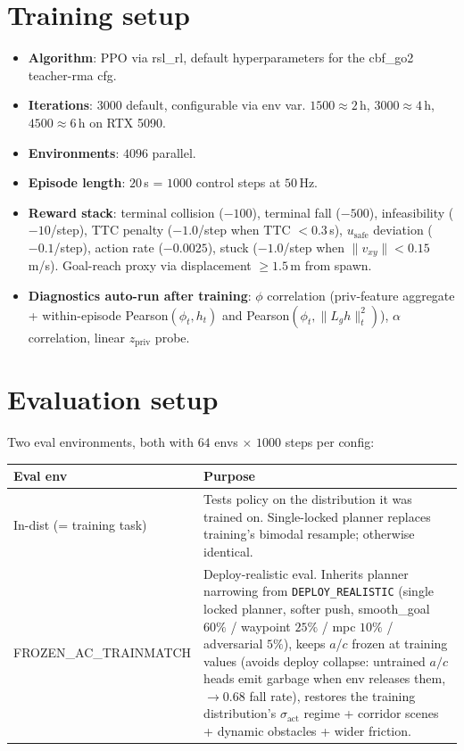 \documentclass[11pt]{article}
\begin{document}
\section*{Training setup}

\begin{itemize}
\item \textbf{Algorithm}: PPO via rsl\_rl, default hyperparameters for the cbf\_go2 teacher-rma cfg.
\item \textbf{Iterations}: $3000$ default, configurable via env var. $1500 \approx 2$\,h, $3000 \approx 4$\,h, $4500 \approx 6$\,h on RTX 5090.
\item \textbf{Environments}: $4096$ parallel.
\item \textbf{Episode length}: $20$\,s = $1000$ control steps at $50$\,Hz.
\item \textbf{Reward stack}: terminal collision ($-100$), terminal fall ($-500$), infeasibility ($-10$/step), TTC penalty ($-1.0$/step when TTC $<0.3$\,s), $u_\text{safe}$ deviation ($-0.1$/step), action rate ($-0.0025$), stuck ($-1.0$/step when $\|v_{xy}\| < 0.15$\,m/s). Goal-reach proxy via displacement $\geq 1.5$\,m from spawn.
\item \textbf{Diagnostics auto-run after training}: $\phi$ correlation (priv-feature aggregate + within-episode Pearson$(\phi_t, h_t)$ and Pearson$(\phi_t, \|L_g h\|^2_t)$), $\alpha$ correlation, linear $z_\text{priv}$ probe.
\end{itemize}

\section*{Evaluation setup}

Two eval environments, both with $64$ envs $\times$ $1000$ steps per config:

\begin{center}
\begin{tabular}{@{}l p{3.6in}@{}}
\toprule
Eval env & Purpose \\
\midrule
In-dist (= training task) & Tests policy on the distribution it was trained on. Single-locked planner replaces training's bimodal resample; otherwise identical. \\
FROZEN\_AC\_TRAINMATCH    & Deploy-realistic eval. Inherits planner narrowing from \texttt{DEPLOY\_REALISTIC} (single locked planner, softer push, smooth\_goal $60\%$ / waypoint $25\%$ / mpc $10\%$ / adversarial $5\%$), keeps $a$/$c$ frozen at training values (avoids deploy collapse: untrained $a/c$ heads emit garbage when env releases them, $\to 0.68$ fall rate), restores the training distribution's $\sigma_\text{act}$ regime + corridor scenes + dynamic obstacles + wider friction. \\
\bottomrule
\end{tabular}
\end{center}
\end{document}
